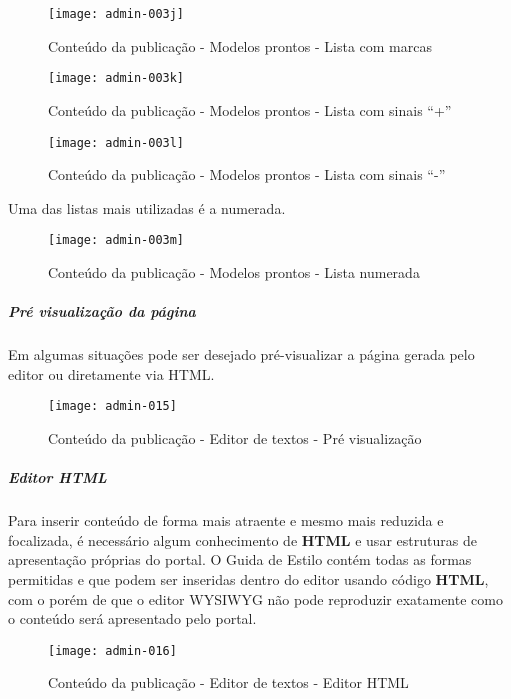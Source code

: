 \begin{figure}[!ht]
    \centering
    \texttt{[image: admin-003j]}
    \caption{Conteúdo da publicação - Modelos prontos - Lista com marcas}\label{RS0006:fig:admin-003j}
\end{figure}

\begin{figure}[!ht]
    \centering
    \texttt{[image: admin-003k]}
    \caption{Conteúdo da publicação - Modelos prontos - Lista com sinais ``+''}\label{RS0006:fig:admin-003k}
\end{figure}

\begin{figure}[!ht]
    \centering
    \texttt{[image: admin-003l]}
    \caption{Conteúdo da publicação - Modelos prontos - Lista com sinais ``-''}\label{RS0006:fig:admin-003l}
\end{figure}

Uma das listas mais utilizadas é a numerada.

\begin{figure}[!ht]
    \centering
    \texttt{[image: admin-003m]}
    \caption{Conteúdo da publicação - Modelos prontos - Lista numerada}\label{RS0006:fig:admin-003m}
\end{figure}

\subparagraph{Pré visualização da página}

Em algumas situações pode ser desejado pré-visualizar a página gerada pelo editor ou diretamente via \gls{HTML}.

\begin{figure}[!ht]
    \centering
    \texttt{[image: admin-015]}
    \caption{Conteúdo da publicação - Editor de textos - Pré visualização}\label{RS0006:fig:admin-015}
\end{figure}

\subparagraph{Editor HTML}

Para inserir conteúdo de forma mais atraente e mesmo mais reduzida e focalizada, é necessário algum conhecimento de \textbf{HTML} e usar estruturas de apresentação próprias do portal. O Guida de Estilo contém todas as formas permitidas e que podem ser inseridas dentro do editor usando código \textbf{HTML}, com o porém de que o editor \gls{WYSIWYG} não pode reproduzir exatamente como o conteúdo será apresentado pelo portal.

\begin{figure}[!ht]
    \centering
    \texttt{[image: admin-016]}
    \caption{Conteúdo da publicação - Editor de textos - Editor HTML}\label{RS0006:fig:admin-016}
\end{figure}

